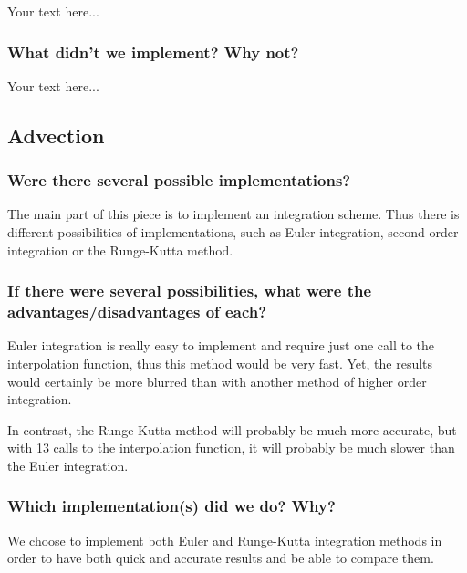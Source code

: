 \documentclass[accepted,single]{gipaper}
\begin{document}
Your text here...

\subsubsection{What didn't we implement? Why not?}

Your text here...

\subsection{Advection}

\subsubsection{Were there several possible implementations?}

The main part of this piece is to implement an integration scheme. Thus there is different possibilities of implementations, such as Euler integration, second order integration or the Runge-Kutta method.

\subsubsection{If there were several possibilities,
what were the advantages/disadvantages of each? }

Euler integration is really easy to implement and require just one call to the interpolation function, thus this method would be very fast. Yet, the results would certainly be more blurred than with another method of higher order integration.

In contrast, the Runge-Kutta method will probably be much more accurate, but with 13 calls to the interpolation function, it will probably be much slower than the Euler integration.

\subsubsection{Which implementation(s) did we do? Why?}

We choose to implement both Euler and Runge-Kutta integration methods in order to have both quick and accurate results and be able to compare them.
\end{document}

